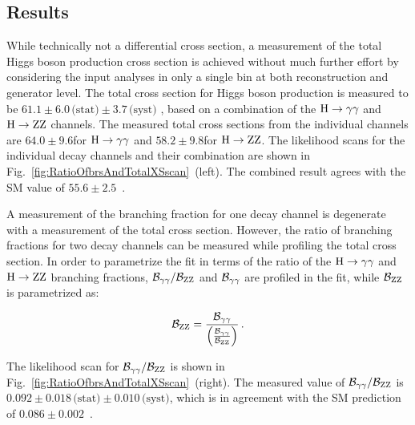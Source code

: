 \subsection{Results}
\label{sec:diffxs-results}

While technically not a differential cross section, a measurement of the total Higgs boson production cross section is achieved without much further effort by considering the input analyses in only a single bin at both reconstruction and generator level.
% 
The total cross section for Higgs boson production is measured to be
$61.1   \pm 6.0 \,\text{(stat)}   \pm 3.7 \,\text{(syst)}  $\pb
, based on a combination of the $\mathrm{H}\to\mathrm{\gamma}\mathrm{\gamma}$ and $\mathrm{H}\to\mathrm{Z}\mathrm{Z}$ channels.
% 
The measured total cross sections from the individual channels are $64.0\pm9.6$\pb for $\mathrm{H}\to\mathrm{\gamma}\mathrm{\gamma}$ and $58.2\pm9.8$\pb for $\mathrm{H}\to\mathrm{Z}\mathrm{Z}$.
% 
The likelihood scans for the individual decay channels and their combination are shown in Fig.~\ref{fig:RatioOfbrsAndTotalXSscan}~(left).
% 
The combined result agrees with the SM value of $55.6\pm2.5$\pb~\cite{deFlorian:2016spz}.


A measurement of the branching fraction for one decay channel is degenerate with a measurement of the total cross section.
% 
However, the ratio of branching fractions for two decay channels can be measured while profiling the total cross section.
% 
In order to parametrize the fit in terms of the ratio of the $\mathrm{H}\to\mathrm{\gamma}\mathrm{\gamma}$ and $\mathrm{H}\to\mathrm{Z}\mathrm{Z}$ branching fractions, $\mathcal{B}_{\mathrm{\gamma}\mathrm{\gamma}}/\mathcal{B}_{\mathrm{Z}\mathrm{Z}}$ and $\mathcal{B}_{\mathrm{\gamma}\mathrm{\gamma}}$ are profiled in the fit, while $\mathcal{B}_{\mathrm{Z}\mathrm{Z}}$ is parametrized as:
% 
\begin{linenomath*}
\begin{equation}
\mathcal{B}_{\mathrm{Z}\mathrm{Z}} = \frac{\mathcal{B}_{\mathrm{\gamma}\mathrm{\gamma}}}{ \left( \frac{\mathcal{B}_{\mathrm{\gamma}\mathrm{\gamma}}}{\mathcal{B}_{\mathrm{Z}\mathrm{Z}}} \right) }
\,.
\end{equation}
\end{linenomath*}
% 
The likelihood scan for $\mathcal{B}_{\mathrm{\gamma}\mathrm{\gamma}}/\mathcal{B}_{\mathrm{Z}\mathrm{Z}}$ is shown in Fig.~\ref{fig:RatioOfbrsAndTotalXSscan}~(right).
% 
The measured value of $\mathcal{B}_{\mathrm{\gamma}\mathrm{\gamma}}/\mathcal{B}_{\mathrm{Z}\mathrm{Z}}$ is
$0.092   \pm 0.018 \,\text{(stat)}   \pm 0.010 \,\text{(syst)}  $,
which is in agreement with the SM prediction of $0.086 \pm 0.002$~\cite{deFlorian:2016spz}.


